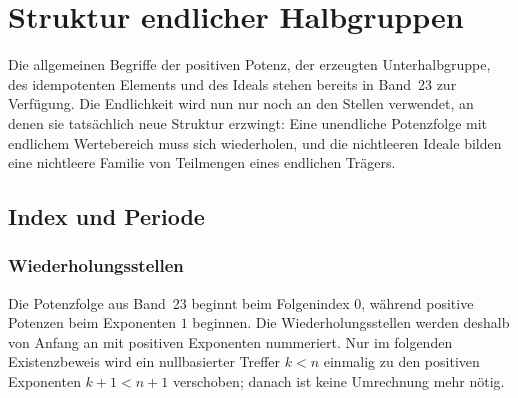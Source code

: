 \documentclass[main.tex]{subfiles}
\begin{document}
\chapter{Struktur endlicher Halbgruppen}

\ProofWideReasonsNearFormula

Die allgemeinen Begriffe der positiven Potenz, der erzeugten
Unterhalbgruppe, des idempotenten Elements und des Ideals stehen bereits in
Band~23 zur Verfügung.  Die Endlichkeit wird nun nur noch an den Stellen
verwendet, an denen sie tatsächlich neue Struktur erzwingt: Eine unendliche
Potenzfolge mit endlichem Wertebereich muss sich wiederholen, und die
nichtleeren Ideale bilden eine nichtleere Familie von Teilmengen eines
endlichen Trägers.

\section{Index und Periode}

\subsection{Wiederholungsstellen}

Die Potenzfolge aus Band~23 beginnt beim Folgenindex \(0\), während positive
Potenzen beim Exponenten \(1\) beginnen.  Die Wiederholungsstellen werden
deshalb von Anfang an mit positiven Exponenten nummeriert.  Nur im folgenden
Existenzbeweis wird ein nullbasierter Treffer \(k<n\) einmalig zu den
positiven Exponenten \(k+1<n+1\) verschoben; danach ist keine Umrechnung mehr
nötig.

\end{document}
